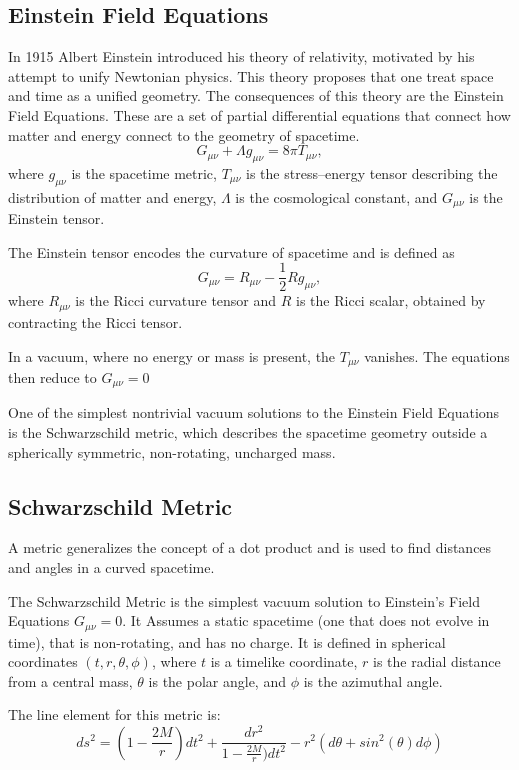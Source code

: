 \documentclass[11pt,a4paper,fleqn]{article}
\begin{document}
\subsection{Einstein Field Equations}
In 1915 Albert Einstein introduced his theory of relativity, motivated by his attempt to unify Newtonian physics. This theory proposes that one treat space and time as a unified geometry. The consequences of this theory are the Einstein Field Equations. These are a set of partial differential equations that connect how matter and energy connect to the geometry of spacetime. 
\[
G_{\mu\nu} + \Lambda g_{\mu\nu} = 8\pi T_{\mu\nu},
\]
where $g_{\mu\nu}$ is the spacetime metric, $T_{\mu\nu}$ is the stress–energy tensor describing the distribution of matter and energy, $\Lambda$ is the cosmological constant, and $G_{\mu\nu}$ is the Einstein tensor.

The Einstein tensor encodes the curvature of spacetime and is defined as
\[
G_{\mu\nu} = R_{\mu\nu} - \frac{1}{2} R g_{\mu\nu},
\]
where $R_{\mu\nu}$ is the Ricci curvature tensor and $R$ is the Ricci scalar, obtained by contracting the Ricci tensor. \cite{alma995709728602511}

In a vacuum, where no energy or mass is present, the $T_{\mu\nu}$ vanishes. The equations then reduce to $G_{\mu\nu} = 0$

One of the simplest nontrivial vacuum solutions to the Einstein Field Equations is the Schwarzschild metric, which describes the spacetime geometry outside a spherically symmetric, non-rotating, uncharged mass.\cite{MunozGerardo2014Oomp}




\subsection{Schwarzschild Metric}
A metric generalizes the concept of a dot product and is used to find distances and angles in a curved spacetime.

The Schwarzschild Metric is the simplest vacuum solution to Einstein's Field Equations $G_{\mu\nu} = 0$. It Assumes a static spacetime (one that does not evolve in time), that is non-rotating, and has no charge. It is defined in spherical coordinates $(t,r,\theta,\phi)$, where $t$ is a timelike coordinate, $r$ is the radial distance from a central mass, $\theta$ is the polar angle, and $\phi$ is the azimuthal angle.

The line element for this metric is:
$$ ds^2 = (1 - \frac{2M}{r})dt^2 + \frac{dr^2}{1 - \frac{2M}{r})dt^2} - r^2(d\theta + sin^2 (\theta) d\phi)$$
\end{document}

